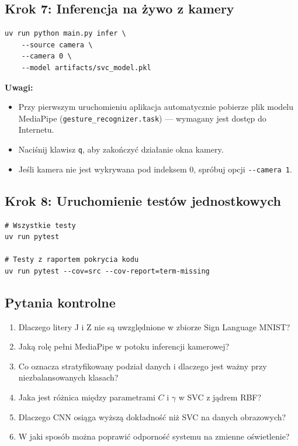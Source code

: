 \subsection*{Krok 7: Inferencja na żywo z kamery}

\begin{lstlisting}[style=styleBash, numbers=none, caption={Uruchomienie inferencji w czasie rzeczywistym}, label=lst:infer-live]
uv run python main.py infer \
    --source camera \
    --camera 0 \
    --model artifacts/svc_model.pkl
\end{lstlisting}

\textbf{Uwagi:}
\begin{itemize}
    \item Przy pierwszym uruchomieniu aplikacja automatycznie pobierze plik
          modelu MediaPipe (\texttt{gesture\_recognizer.task}) --- wymagany
          jest dostęp do Internetu.
    \item Naciśnij klawisz \texttt{q}, aby zakończyć działanie okna kamery.
    \item Jeśli kamera nie jest wykrywana pod indeksem 0, spróbuj
          opcji \texttt{-{}-camera 1}.
\end{itemize}

\subsection*{Krok 8: Uruchomienie testów jednostkowych}

\begin{lstlisting}[style=styleBash, numbers=none, caption={Uruchamianie testów pytest}, label=lst:tests]
# Wszystkie testy
uv run pytest

# Testy z raportem pokrycia kodu
uv run pytest --cov=src --cov-report=term-missing
\end{lstlisting}

\subsection*{Pytania kontrolne}

\begin{enumerate}
    \item Dlaczego litery J i Z nie są uwzględnione w zbiorze Sign Language MNIST?
    \item Jaką rolę pełni MediaPipe w potoku inferencji kamerowej?
    \item Co oznacza stratyfikowany podział danych i dlaczego jest ważny
          przy niezbalansowanych klasach?
    \item Jaka jest różnica między parametrami $C$ i $\gamma$ w SVC z jądrem RBF?
    \item Dlaczego CNN osiąga wyższą dokładność niż SVC na danych obrazowych?
    \item W jaki sposób można poprawić odporność systemu na zmienne oświetlenie?
\end{enumerate}
